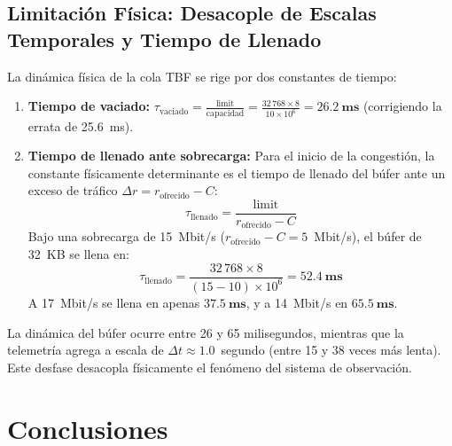 \documentclass[11pt,a4paper]{article}
\begin{document}
\subsection{Limitación Física: Desacople de Escalas Temporales y Tiempo de Llenado}
La dinámica física de la cola TBF se rige por dos constantes de tiempo:
\begin{enumerate}
    \item \textbf{Tiempo de vaciado:} $\tau_{\text{vaciado}} = \frac{\text{limit}}{\text{capacidad}} = \frac{32\,768 \times 8}{10 \times 10^6} = \mathbf{26.2 \ \text{ms}}$ (corrigiendo la errata de 25.6~ms).
    \item \textbf{Tiempo de llenado ante sobrecarga:} Para el inicio de la congestión, la constante físicamente determinante es el tiempo de llenado del búfer ante un exceso de tráfico $\Delta r = r_{\text{ofrecido}} - C$:
    \begin{equation}
        \tau_{\text{llenado}} = \frac{\text{limit}}{r_{\text{ofrecido}} - C}
    \end{equation}
    Bajo una sobrecarga de 15~Mbit/s ($r_{\text{ofrecido}} - C = 5$~Mbit/s), el búfer de 32~KB se llena en:
    \begin{equation}
        \tau_{\text{llenado}} = \frac{32\,768 \times 8}{(15 - 10) \times 10^6} = \mathbf{52.4 \ \text{ms}}
    \end{equation}
    A 17~Mbit/s se llena en apenas $\mathbf{37.5 \ \text{ms}}$, y a 14~Mbit/s en $\mathbf{65.5 \ \text{ms}}$.
\end{enumerate}
La dinámica del búfer ocurre entre 26 y 65 milisegundos, mientras que la telemetría agrega a escala de $\Delta t \approx 1.0$~segundo (entre 15 y 38 veces más lenta). Este desfase desacopla físicamente el fenómeno del sistema de observación.

\section{Conclusiones}
\end{document}
